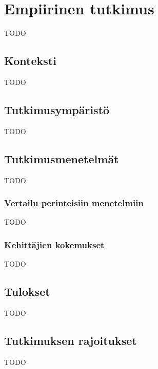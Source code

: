 \vspace{21.5pt}
\chapter{Empiirinen tutkimus}
TODO

\section{Konteksti}

TODO

\section{Tutkimusympäristö}

TODO

\section{Tutkimusmenetelmät}

TODO
\subsection{Vertailu perinteisiin menetelmiin}

TODO

\subsection{Kehittäjien kokemukset}

TODO

\section{Tulokset}

TODO

\section{Tutkimuksen rajoitukset}

TODO